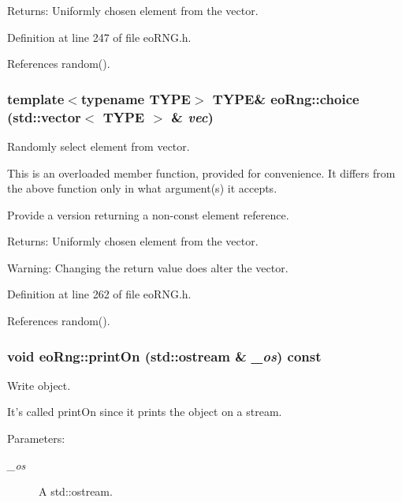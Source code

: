 \begin{Desc}
\item[Returns:]Uniformly chosen element from the vector. \end{Desc}


Definition at line 247 of file eo\-RNG.h.

References random().
\subsubsection{\setlength{\rightskip}{0pt plus 5cm}template$<$typename TYPE$>$ TYPE\& eo\-Rng::choice (std::vector$<$ TYPE $>$ \& {\em vec})\hspace{0.3cm}{\tt  [inline]}}\label{classeo_rng_a15}


Randomly select element from vector. 

This is an overloaded member function, provided for convenience. It differs from the above function only in what argument(s) it accepts.

Provide a version returning a non-const element reference.

\begin{Desc}
\item[Returns:]Uniformly chosen element from the vector.\end{Desc}
\begin{Desc}
\item[Warning:]Changing the return value does alter the vector. \end{Desc}


Definition at line 262 of file eo\-RNG.h.

References random().
\subsubsection{\setlength{\rightskip}{0pt plus 5cm}void eo\-Rng::print\-On (std::ostream \& {\em \_\-os}) const\hspace{0.3cm}{\tt  [inline, virtual]}}\label{classeo_rng_a16}


Write object. 

It's called print\-On since it prints the object on a stream. \begin{Desc}
\item[Parameters:]
\begin{description}
\item[{\em \_\-os}]A std::ostream. \end{description}
\end{Desc}


